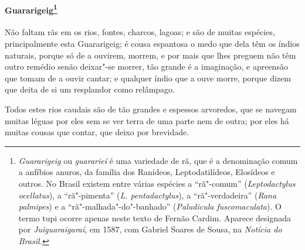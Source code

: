 \paragraph{Guararigeig\footnote{ \textit{Guararigeig} ou
\textit{guararieí} é uma variedade de rã, que é a denominação comum a
anfíbios anuros, da família dos Ranídeos, Leptodatilídeos, Elosídeos e
outros. No Brasil existem entre várias espécies a ``rã"-comum''
(\textit{Leptodactylus ocellatus}), a ``rã"-pimenta'' (\textit{L. pentadactylus}), 
a ``rã"-verdadeira'' (\textit{Rana palmipes}) e a
``rã"-malhada"-do"-banhado'' (\textit{Paludicula fuscomaculata}). O termo
tupi ocorre apenas neste texto de Fernão Cardim. Aparece designada por
\textit{Juiguaraigaraí}, em 1587, com Gabriel Soares de Sousa, na
\textit{Notícia do Brasil.}}} Não faltam rãs em os rios,
fontes, charcos, lagoas; e são de muitas espécies, principalmente esta
Guararigeig; é cousa espantosa o medo que dela têm os índios
naturais, porque só de a ouvirem, morrem, e por mais que lhes preguem
não têm outro remédio senão deixar"-se morrer, tão grande é a
imaginação, e apreensão que tomam de a ouvir cantar; e qualquer índio
que a ouve morre, porque dizem que deita de si um resplandor como relâmpago.

 Todos estes rios caudais são de tão grandes e espessos arvoredos, que
se navegam muitas léguas por eles sem se ver terra de uma parte nem de
outra; por eles há muitas cousas que contar, que deixo por brevidade. 


